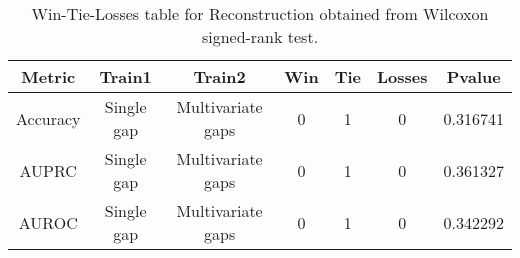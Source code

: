 \begin{table}[H]
\centering
\begin{tabular}{|c|c|c|c|c|c|c|}

\textbf{Metric} & \textbf{Train1} &    \textbf{Train2} &  \textbf{Win} &  \textbf{Tie} &  \textbf{Losses} &  \textbf{Pvalue} \\
\hline

       Accuracy &      Single gap &  Multivariate gaps &             0 &             1 &                0 &         0.316741 \\
\hline
          AUPRC &      Single gap &  Multivariate gaps &             0 &             1 &                0 &         0.361327 \\
\hline
          AUROC &      Single gap &  Multivariate gaps &             0 &             1 &                0 &         0.342292 \\
\hline

\end{tabular}
\caption{Win-Tie-Losses table for Reconstruction obtained from Wilcoxon signed-rank test.}
\label{tab:reconstruction_training_data_comparison}
\end{table}